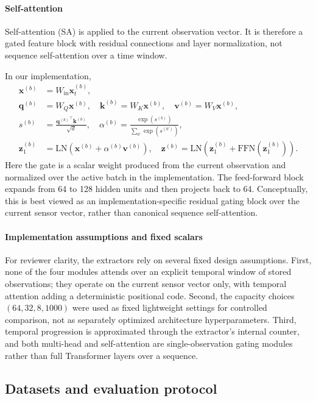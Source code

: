 \documentclass[sn-basic]{sn-jnl}%
\begin{document}
\paragraph{Self-attention}
Self-attention (SA) is applied to the current observation vector. It is therefore a gated feature block with residual connections and layer normalization, not sequence self-attention over a time window.

In our implementation,
\begin{align}
		\mathbf{x}^{(b)} &= W_{\mathrm{in}}\mathbf{x}_t^{(b)},\\
		\mathbf{q}^{(b)} &= W_Q\mathbf{x}^{(b)},\quad \mathbf{k}^{(b)}=W_K\mathbf{x}^{(b)},\quad \mathbf{v}^{(b)}=W_V\mathbf{x}^{(b)},\\
		s^{(b)} &= \frac{{\mathbf{q}^{(b)}}^\top\mathbf{k}^{(b)}}{\sqrt{d}},\quad
		\alpha^{(b)}=\frac{\exp(s^{(b)})}{\sum_{b'}\exp(s^{(b')})},\\
		\mathbf{z}_1^{(b)} &= \mathrm{LN}\!\left(\mathbf{x}^{(b)}+\alpha^{(b)}\mathbf{v}^{(b)}\right),\quad
		\mathbf{z}^{(b)}=\mathrm{LN}\!\left(\mathbf{z}_1^{(b)}+\mathrm{FFN}(\mathbf{z}_1^{(b)})\right).
\end{align}
	Here the gate is a scalar weight produced from the current observation and normalized over the active batch in the implementation. The feed-forward block expands from 64 to 128 hidden units and then projects back to 64. Conceptually, this is best viewed as an implementation-specific residual gating block over the current sensor vector, rather than canonical sequence self-attention.

	\paragraph{Implementation assumptions and fixed scalars}
	For reviewer clarity, the extractors rely on several fixed design assumptions. First, none of the four modules attends over an explicit temporal window of stored observations; they operate on the current sensor vector only, with temporal attention adding a deterministic positional code. Second, the capacity choices $(64,32,8,1000)$ were used as fixed lightweight settings for controlled comparison, not as separately optimized architecture hyperparameters. Third, temporal progression is approximated through the extractor's internal counter, and both multi-head and self-attention are single-observation gating modules rather than full Transformer layers over a sequence.
\subsection{Datasets and evaluation protocol} \label{sec:experiment} 
\end{document}
